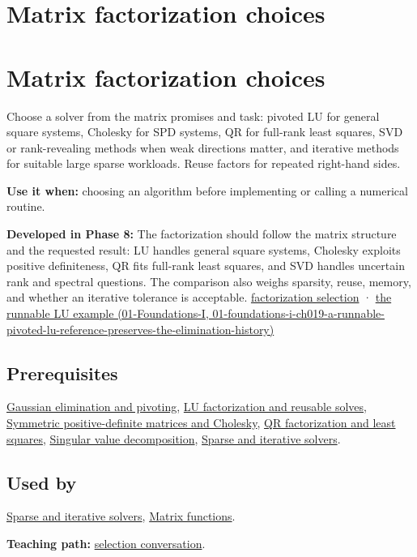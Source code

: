\hypertarget{appendix-221a483bec2d}{}
\section*{Matrix factorization choices}
\section{Matrix factorization choices}\label{appendix-221a483bec2d-matrix-factorization-choices}

Choose a solver from the matrix promises and task: pivoted LU for general square systems, Cholesky for SPD systems, QR for full-rank least squares, SVD or rank-revealing methods when weak directions matter, and iterative methods for suitable large sparse workloads. Reuse factors for repeated right-hand sides.

\textbf{Use it when:} choosing an algorithm before implementing or calling a numerical routine.

\textbf{Developed in Phase 8:} The factorization should follow the matrix structure and the requested result: LU handles general square systems, Cholesky exploits positive definiteness, QR fits full-rank least squares, and SVD handles uncertain rank and spectral questions. The comparison also weighs sparsity, reuse, memory, and whether an iterative tolerance is acceptable. \hyperref[02-foundations-ii-ch038-choose-a-factorization-from-structure-and-the-requested-answer]{factorization selection} · \href{../01-Foundations-I/main.pdf\#nameddest=01-foundations-i-ch019-a-runnable-pivoted-lu-reference-preserves-the-elimination-history}{the runnable LU example (01-Foundations-I, 01-foundations-i-ch019-a-runnable-pivoted-lu-reference-preserves-the-elimination-history)}

\subsection{Prerequisites}\label{appendix-221a483bec2d-prerequisites}

\hyperref[appendix-f6e77f4a200f]{Gaussian elimination and pivoting}, \hyperref[appendix-55e4b5b0a1e6]{LU factorization and reusable solves}, \hyperref[appendix-50d2ea3c9b26]{Symmetric positive-definite matrices and Cholesky}, \hyperref[appendix-c3421e6b4f2c]{QR factorization and least squares}, \hyperref[appendix-1fad5e7f36fa]{Singular value decomposition}, \hyperref[appendix-67c87a3d9e94]{Sparse and iterative solvers}.

\subsection{Used by}\label{appendix-221a483bec2d-used-by}

\hyperref[appendix-67c87a3d9e94]{Sparse and iterative solvers}, \hyperref[appendix-0f4bc2bf2b1f]{Matrix functions}.

\textbf{Teaching path:} \hyperref[02-foundations-ii-ch038-close-the-journey-with-an-algorithm-selection-conversation]{selection conversation}.
